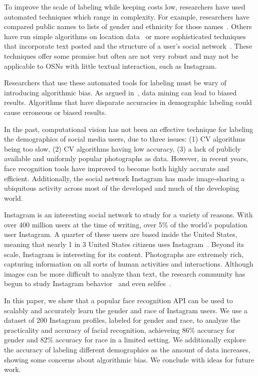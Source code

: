 To improve the scale of labeling while keeping costs low, researchers have used automated techniques which range in complexity.
For example, researchers have compared public names to lists of gender and ethnicity for those names~\cite{mislove-2011-twitter, ICWSM101534}.
Others have run simple algorithms on location data~\cite{riederer2015cosn} or more sophisticated techniques that incorporate text posted and the structure of a user's social network~\cite{ICWSM112886, pennacchiotti2011democrats}.
These techniques offer some promise but often are not very robust and may not be applicable to OSNs with little textual interaction, such as Instagram.

Researchers that use these automated tools for labeling must be wary of introducing algorithmic bias.
As argued in~\cite{Selbst:2014wi}, data mining can lead to biased results.
Algorithms that have disparate accuracies in demographic labeling could cause erroneous or biased results.

In the past, computational vision has not been an effective technique for labeling the demographics of social media users, due to three issues: (1) CV algorithms being too slow, (2) CV algorithms having low accuracy, (3) a lack of publicly available and uniformly popular photographs as data.
However, in recent years, face recognition tools have improved to become both highly accurate and efficient.
Additionally, the social network Instagram has made image-sharing a ubiquitous activity across most of the developed and much of the developing world.

Instagram is an interesting social network to study for a variety of reasons.
With over 400 million users at the time of writing, over 5\% of the world's population user Instagram.
A quarter of these users are based inside the United States, meaning that nearly 1 in 3 United States citizens uses Instagram~\cite{igstats}.
Beyond its scale, Instagram is interesting for its content.
Photographs are extremely rich, capturing information on all sorts of human activities and interactions.
Although images can be more difficult to analyze than text, the research community has begun to study Instagram behavior~\cite{hu2014we, bakhshi2014faces} and even selifes~\cite{souza2015dawn}.

In this paper, we show that a popular face recognition API can be used to scalably and accurately learn the gender and race of Instagram users.
We use a dataset of 200 Instagram profiles, labeled for gender and race, to analyze the practicality and accuracy of facial recognition, achieveing 86\% accuracy for gender and 82\% accuracy for race in a limited setting.
We additionally explore the accuracy of labeling different demographics as the amount of data increases, showing some concerns about algorithmic bias.
We conclude with ideas for future work.


